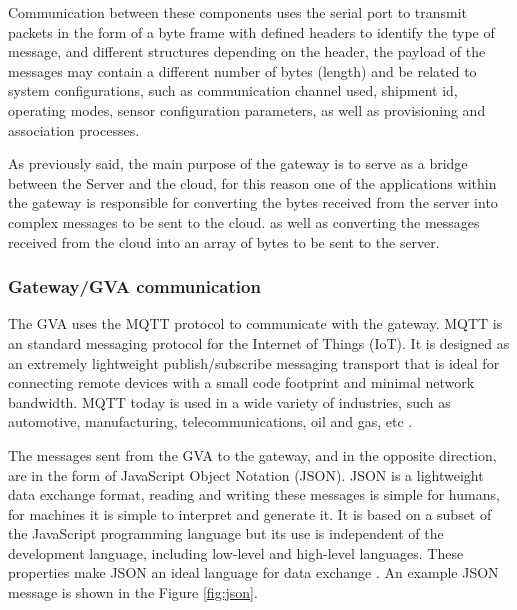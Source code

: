 \documentclass[journal]{IEEEtran}	%
\begin{document}
Communication between these components uses the serial port to transmit packets in the form of a byte frame with defined headers to identify the type of message, and different structures depending on the header, the payload of the messages may contain a different number of bytes (length) and be related to system configurations, such as communication channel used, shipment id, operating modes, sensor configuration parameters, as well as provisioning and association processes. 

As previously said, the main purpose of the gateway is to serve as a bridge between the Server and the cloud, for this reason one of the applications within the gateway is responsible for converting the bytes received from the server into complex messages to be sent to the cloud. as well as converting the messages received from the cloud into an array of bytes to be sent to the server.

\subsubsection{Gateway/GVA communication}

The GVA uses the MQTT protocol to communicate with the gateway. MQTT is an standard messaging protocol for the Internet of Things (IoT). It is designed as an extremely lightweight publish/subscribe messaging transport that is ideal for connecting remote devices with a small code footprint and minimal network bandwidth. MQTT today is used in a wide variety of industries, such as automotive, manufacturing, telecommunications, oil and gas, etc \cite{mqtt}.

The messages sent from the GVA to the gateway, and in the opposite direction, are in the form of JavaScript Object Notation (JSON). JSON is a lightweight data exchange format, reading and writing these messages is simple for humans, for machines it is simple to interpret and generate it. It is based on a subset of the JavaScript programming language but its use is independent of the development language, including low-level and high-level languages. These properties make JSON an ideal language for data exchange \cite{json}. An example JSON message is shown in the Figure \ref{fig:json}.
\end{document}
